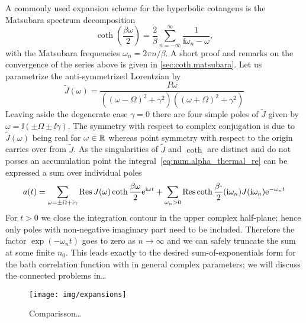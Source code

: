A commonly used expansion scheme for the hyperbolic cotangens is the Matsubara spectrum decomposition \cite{Ma00_many_particle}
\begin{equation}
  \coth\left(\frac{\beta \omega}{2}\right) = \frac{2}{\beta} \sum_{n=-\infty}^\infty \frac{1}{\ii\omega_n - \omega},
  \label{eq:num.matsubara_expansion}
\end{equation}
with the Matsubara frequencies $\omega_n = 2\pi n / \beta$.
A short proof and remarks on the convergence of the series above is given in \autoref{sec:coth.matsubara}.
Let us parametrize the anti-symmetrized Lorentzian by
\begin{equation}
  \tilde J(\omega) = \frac{P \omega}{((\omega - \Omega)^2 + \gamma^2) ((\omega + \Omega)^2 + \gamma^2)}
  \label{eq:num.anti_lorentz}
\end{equation}
Leaving aside the degenerate case $\gamma = 0$ there are four simple poles of $\tilde J$ given by $\omega = \ii(\pm\Omega \pm\ii\gamma)$.
The symmetry with respect to complex conjugation is due to $\tilde J(\omega)$ being real for $\omega\in\mathbb{R}$ whereas point symmetry with respect to the origin carries over from $\tilde J$.
As the singularities of $\tilde J$ and $\coth$ are distinct and do not posses an accumulation point the integral~\ref{eq:num.alpha_thermal_re} can be expressed a sum over individual poles
\begin{equation}
  a(t) = \sum_{\omega = \pm\Omega + \ii\gamma} \Res J(\omega) \coth \frac{\beta \omega}{2} \exp[\ii\omega t]
  + \sum_{\omega_n > 0} \Res \coth \frac{\beta\cdot}{2}(\ii\omega_n) J(\ii\omega_n) \exp[-\omega_n t]
  \label{eq:num.sum_over_poles}
\end{equation}
For $t>0$ we close the integration contour in the upper complex half-plane; hence only poles with non-negative imaginary part need to be included.
Therefore the factor $\exp(-\omega_n t)$ goes to zero as $n\to\infty$ and we can safely truncate the sum at some finite $n_0$.
This leads exactly to the desired sum-of-exponentials form for the bath correlation function with in general complex parameters; we will discuss the connected problems in\dots\\


\begin{figure}
  \centering
  \texttt{[image: img/expansions]}
  \caption{Comparisson\dots}
  \label{fig:num.expansion}
\end{figure}

